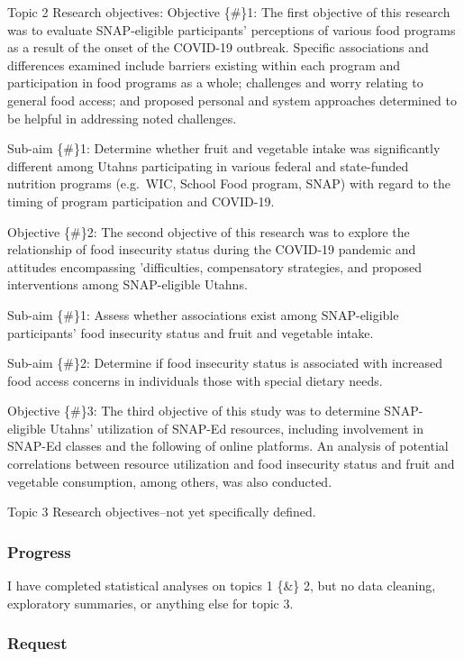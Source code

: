 \documentclass[
]{article}
\begin{document}
Topic 2 Research objectives: Objective \{\#\}1: The first objective of
this research was to evaluate SNAP-eligible participants' perceptions of
various food programs as a result of the onset of the COVID-19 outbreak.
Specific associations and differences examined include barriers existing
within each program and participation in food programs as a whole;
challenges and worry relating to general food access; and proposed
personal and system approaches determined to be helpful in addressing
noted challenges.

Sub-aim \{\#\}1: Determine whether fruit and vegetable intake was
significantly different among Utahns participating in various federal
and state-funded nutrition programs (e.g.~WIC, School Food program,
SNAP) with regard to the timing of program participation and COVID-19.

Objective \{\#\}2: The second objective of this research was to explore
the relationship of food insecurity status during the COVID-19 pandemic
and attitudes encompassing 'difficulties, compensatory strategies, and
proposed interventions among SNAP-eligible Utahns.

Sub-aim \{\#\}1: Assess whether associations exist among SNAP-eligible
participants' food insecurity status and fruit and vegetable intake.

Sub-aim \{\#\}2: Determine if food insecurity status is associated with
increased food access concerns in individuals those with special dietary
needs.

Objective \{\#\}3: The third objective of this study was to determine
SNAP-eligible Utahns' utilization of SNAP-Ed resources, including
involvement in SNAP-Ed classes and the following of online platforms. An
analysis of potential correlations between resource utilization and food
insecurity status and fruit and vegetable consumption, among others, was
also conducted.

Topic 3 Research objectives--not yet specifically defined.

\hypertarget{progress}{%
\subsubsection{Progress}\label{progress}}

I have completed statistical analyses on topics 1 \{\&\} 2, but no data
cleaning, exploratory summaries, or anything else for topic 3.

\hypertarget{request}{%
\subsubsection{Request}\label{request}}
\end{document}
